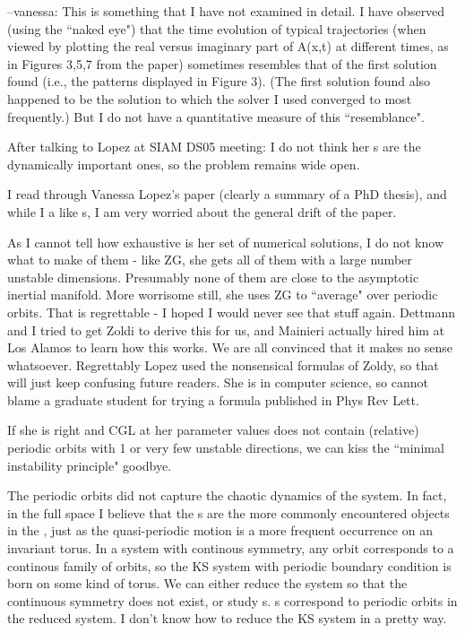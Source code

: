 --vanessa:
This is something that I have not examined in detail.  I have observed (using
the ``naked eye") that the time evolution of typical trajectories (when viewed
by plotting the real versus imaginary part of A(x,t) at different times, as in
Figures 3,5,7 from the paper) sometimes resembles that of the first solution
found (i.e., the patterns displayed in Figure 3). (The first solution
found also happened to be the solution to which the solver I used
converged to most frequently.)  But I do not have a
quantitative measure of this ``resemblance".

After talking to Lopez at SIAM DS05 meeting: I do not think
her \rpo s are the dynamically important ones, so the problem remains wide open.

I read through
Vanessa Lopez's paper (clearly a summary of a PhD thesis), and while I
a like {\rpo s}, I am very worried about the general drift
of the paper.

As I cannot tell how exhaustive is her set of numerical solutions, I do
not know what to make of them - like ZG, she gets all of them with a large
number unstable dimensions. Presumably none of them are close to the
asymptotic inertial manifold. More worrisome still, she uses ZG to
``average" over periodic orbits. That is regrettable - I hoped I would
never see that stuff again. Dettmann and I tried to get Zoldi to
derive this for us, and Mainieri actually hired him at Los Alamos to learn
how this works. We are all convinced that it makes no sense whatsoever.
Regrettably Lopez used the nonsensical formulas of Zoldy, so that will
just keep confusing future readers.
She is in computer science, so cannot
blame a graduate student for trying a formula published in Phys Rev Lett.


If she is right and CGL at her parameter values does not contain
(relative) periodic orbits with 1 or very few unstable directions, we can
kiss the ``minimal instability principle" goodbye.

The
periodic orbits
did not capture the chaotic dynamics of the system. In fact, in the full
space I believe that the {\rpo s} are the more commonly
encountered objects in the \statesp, just as the quasi-periodic motion is a
more frequent occurrence on an invariant torus. In a system with continous
symmetry, any orbit corresponds to a continous family of orbits, so the KS
system with periodic boundary condition is born on some kind of torus. We can
either reduce the system so that the continuous symmetry does not exist, or
study {\rpo s}. {\Rpo s} correspond to periodic
orbits in the reduced system. I don't know how to reduce the KS system in a
pretty way.


